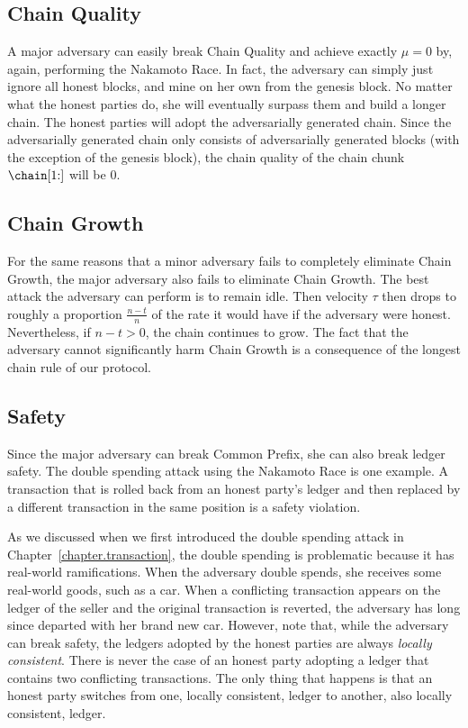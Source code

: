 \subsection*{Chain Quality}
A major adversary can easily break Chain Quality and achieve exactly $\mu = 0$ by, again,
performing the Nakamoto Race. In fact, the adversary can simply just ignore all honest blocks,
and mine on her own from the genesis block. No matter what the honest parties do, she will eventually
surpass them and build a longer chain. The honest parties will adopt the adversarially generated
chain. Since the adversarially generated chain only consists of adversarially generated blocks
(with the exception of the genesis block), the chain quality of the chain chunk $\chain[1{:}]$
will be $0$.

\subsection*{Chain Growth}
For the same reasons that a minor adversary fails to completely eliminate Chain Growth, the
major adversary also fails to eliminate Chain Growth. The best attack the adversary can perform
is to remain idle. Then velocity $\tau$ then drops to roughly a proportion $\frac{n - t}{n}$ of the rate
it would have if the adversary were honest. Nevertheless, if $n - t > 0$, the chain continues
to grow. The fact that the adversary cannot significantly harm Chain Growth is a consequence of
the longest chain rule of our protocol.

\subsection*{Safety}
Since the major adversary can break Common Prefix, she can also break ledger safety. The double
spending attack using the Nakamoto Race is one example. A transaction that is rolled back from
an honest party's ledger and then replaced by a different transaction in the same position
is a safety violation.

As we discussed when we first introduced the double spending attack in Chapter~\ref{chapter.transaction},
the double spending is problematic because it has real-world ramifications. When the adversary double
spends, she receives some real-world goods, such as a car. When a conflicting transaction appears on
the ledger of the seller and the original transaction is reverted, the adversary has long since
departed with her brand new car. However, note that, while the adversary can break safety, the
ledgers adopted by the honest parties are always \emph{locally consistent}. There is never the
case of an honest party adopting a ledger that contains two conflicting transactions. The only
thing that happens is that an honest party switches from one, locally consistent, ledger to another,
also locally consistent, ledger.

